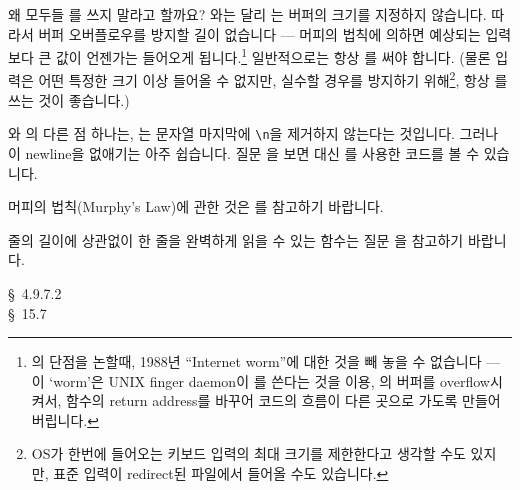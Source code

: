 \begin{faq}
	왜 모두들 를 쓰지 말라고 할까요?
\A
	와는 달리 는 버퍼의 크기를 지정하지 않습니다.
	따라서 버퍼 오버플로우를 방지할 길이 없습니다 ---
	머피의 법칙에 의하면 예상되는 입력보다 큰 값이 언젠가는 들어오게
	됩니다.\footnote{의 단점을 논할때,
	1988년 ``Internet worm''에 대한 것을 빼 놓을 수 없습니다 --- 
	이 `worm'은 UNIX finger daemon이 를 쓴다는 것을 이용,
	의 버퍼를 overflow시켜서, 함수의 return address를 바꾸어
	코드의 흐름이 다른 곳으로 가도록 만들어 버립니다.}
	일반적으로는 항상
	를 써야 합니다. (물론 입력은 어떤 특정한 크기 이상 들어올
	수 없지만, 실수할 경우를 방지하기 위해\footnote{OS가 한번에 들어오는
	키보드 입력의 최대 크기를 제한한다고 생각할 수도 있지만,
	표준 입력이 redirect된 파일에서 들어올 수도 있습니다.},
	항상 를 쓰는 것이 좋습니다.)

	와 의 다른 점 하나는, 는 문자열 마지막에
	\verb+\n+을 제거하지 않는다는 것입니다.  그러나 이 newline을 없애기는
	아주 쉽습니다.  질문 을 보면  대신 를
	사용한 코드를 볼 수 있습니다.

\T
	머피의 법칙(Murphy's Law)에 관한 것은 \cite{raymond:jargon}를
        참고하기 바랍니다.

        줄의 길이에 상관없이 한 줄을 완벽하게 읽을 수 있는  함수는
        질문 을 참고하기 바랍니다.

\R
	\cite{rationale} \S\ 4.9.7.2 \\
	\cite{hs} \S\ 15.7 
\end{faq}



